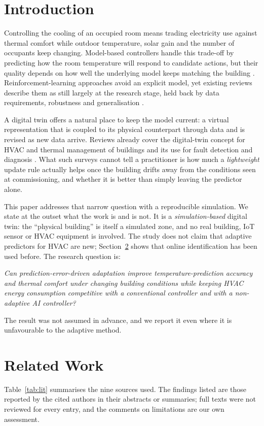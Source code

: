 \documentclass[conference]{IEEEtran}
\begin{document}
\section{Introduction}
Controlling the cooling of an occupied room means trading electricity use against thermal comfort while outdoor temperature, solar gain and the number of occupants keep changing. Model-based controllers handle this trade-off by predicting how the room temperature will respond to candidate actions, but their quality depends on how well the underlying model keeps matching the building \cite{drgona2020}. Reinforcement-learning approaches avoid an explicit model, yet existing reviews describe them as still largely at the research stage, held back by data requirements, robustness and generalisation \cite{wang2020}.

A digital twin offers a natural place to keep the model current: a virtual representation that is coupled to its physical counterpart through data and is revised as new data arrive. Reviews already cover the digital-twin concept for HVAC and thermal management of buildings \cite{ibrahim2026} and its use for fault detection and diagnosis \cite{hodavand2023}. What such surveys cannot tell a practitioner is how much a \emph{lightweight} update rule actually helps once the building drifts away from the conditions seen at commissioning, and whether it is better than simply leaving the predictor alone.

This paper addresses that narrow question with a reproducible simulation. We state at the outset what the work is and is not. It is a \emph{simulation-based} digital twin: the ``physical building'' is itself a simulated zone, and no real building, IoT sensor or HVAC equipment is involved. The study does not claim that adaptive predictors for HVAC are new; Section~\ref{sec:related} shows that online identification has been used before. The research question is:

\emph{Can prediction-error-driven adaptation improve temperature-prediction accuracy and thermal comfort under changing building conditions while keeping HVAC energy consumption competitive with a conventional controller and with a non-adaptive AI controller?}

The result was not assumed in advance, and we report it even where it is unfavourable to the adaptive method.

\section{Related Work}\label{sec:related}
Table~\ref{tab:lit} summarises the nine sources used. The findings listed are those reported by the cited authors in their abstracts or summaries; full texts were not reviewed for every entry, and the comments on limitations are our own assessment.
\end{document}
